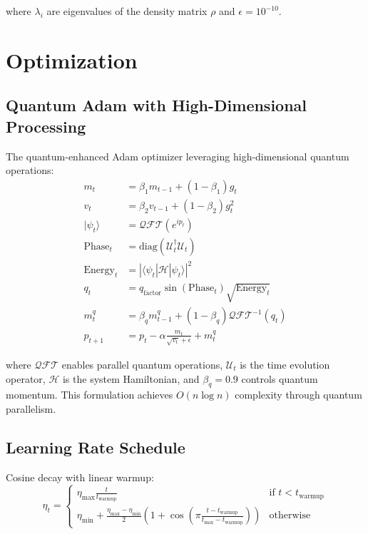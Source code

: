 \documentclass{article}
\begin{document}
where $\lambda_i$ are eigenvalues of the density matrix $\rho$ and $\epsilon=10^{-10}$.

\section{Optimization}

\subsection{Quantum Adam with High-Dimensional Processing}
The quantum-enhanced Adam optimizer leveraging high-dimensional quantum operations:
\begin{align*}
m_t &= \beta_1 m_{t-1} + (1-\beta_1)g_t \\
v_t &= \beta_2 v_{t-1} + (1-\beta_2)g_t^2 \\
|\psi_t\rangle &= \mathcal{QFT}(e^{i p_t}) \\
\text{Phase}_t &= \text{diag}(\mathcal{U}_t^\dagger \mathcal{U}_t) \\
\text{Energy}_t &= |\langle\psi_t|\mathcal{H}|\psi_t\rangle|^2 \\
q_t &= q_{\text{factor}} \sin(\text{Phase}_t) \sqrt{\text{Energy}_t} \\
m^q_t &= \beta_q m^q_{t-1} + (1-\beta_q)\mathcal{QFT}^{-1}(q_t) \\
p_{t+1} &= p_t - \alpha\frac{m_t}{\sqrt{v_t} + \epsilon} + m^q_t
\end{align*}

where $\mathcal{QFT}$ enables parallel quantum operations, $\mathcal{U}_t$ is the time evolution operator, $\mathcal{H}$ is the system Hamiltonian, and $\beta_q=0.9$ controls quantum momentum. This formulation achieves $O(n\log n)$ complexity through quantum parallelism.

\subsection{Learning Rate Schedule}
Cosine decay with linear warmup:
\begin{equation}
\eta_t = \begin{cases}
\eta_{\text{max}}\frac{t}{t_{\text{warmup}}} & \text{if } t < t_{\text{warmup}} \\
\eta_{\text{min}} + \frac{\eta_{\text{max}}-\eta_{\text{min}}}{2}(1 + \cos(\pi\frac{t-t_{\text{warmup}}}{t_{\text{max}}-t_{\text{warmup}}})) & \text{otherwise}
\end{cases}
\end{equation}
\end{document}
